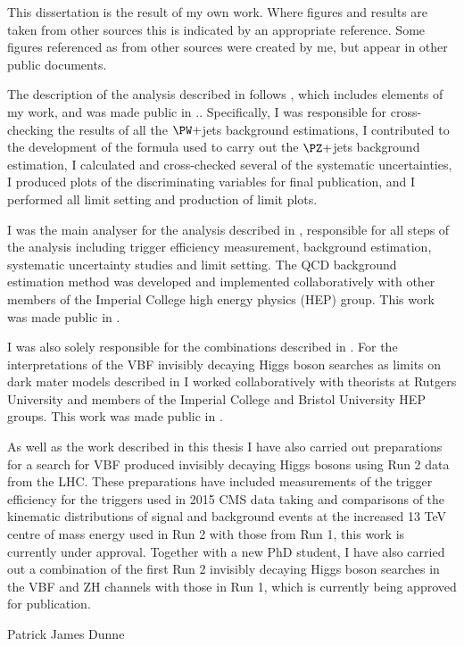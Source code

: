 \begin{declaration}
  This dissertation is the result of my own work. Where figures and results are taken from other sources this is indicated by an appropriate reference. Some figures referenced as from other sources were created by me, but appear in other public documents. 

The description of the analysis described in  follows , which includes elements of my work, and was made public in .. Specifically, I was responsible for cross-checking the results of all the $\PW+$jets background estimations, I contributed to the development of the formula used to carry out the $\PZ+$jets background estimation, I calculated and cross-checked several of the systematic uncertainties, I produced plots of the discriminating variables for final publication, and I performed all limit setting and production of limit plots. 

I was the main analyser for the analysis described in , responsible for all steps of the analysis including trigger efficiency measurement, background estimation, systematic uncertainty studies and limit setting. The QCD background estimation method was developed and implemented collaboratively with other members of the Imperial College high energy physics (HEP) group. This work was made public in .

I was also solely responsible for the combinations described in . For the interpretations of the VBF invisibly decaying Higgs boson searches as limits on dark mater models described in  I worked collaboratively with theorists at Rutgers University and members of the Imperial College and Bristol University HEP groups. This work was made public in .

As well as the work described in this thesis I have also carried out preparations for a search for VBF produced invisibly decaying Higgs bosons using Run 2 data from the LHC. These preparations have included measurements of the trigger efficiency for the triggers used in 2015 CMS data taking and comparisons of the kinematic distributions of signal and background events at the increased 13 TeV centre of mass energy used in Run 2 with those from Run 1, this work is currently under approval. Together with a new PhD student, I have also carried out a combination of the first Run 2 invisibly decaying Higgs boson searches in the VBF and ZH channels with those in Run 1, which is currently being approved for publication.


  \vspace*{1cm}
  \begin{flushright}
    Patrick James Dunne
  \end{flushright}
\end{declaration}


